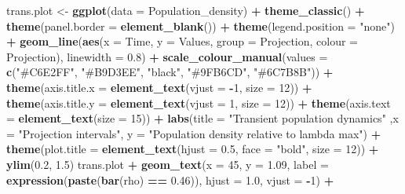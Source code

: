 \documentclass[
]{book}
\newenvironment{Shaded}{\begin{snugshade}}{\end{snugshade}}
\newcommand{\AttributeTok}[1]{\textcolor[rgb]{0.13,0.29,0.53}{#1}}
\newcommand{\DecValTok}[1]{\textcolor[rgb]{0.00,0.00,0.81}{#1}}
\newcommand{\FloatTok}[1]{\textcolor[rgb]{0.00,0.00,0.81}{#1}}
\newcommand{\FunctionTok}[1]{\textcolor[rgb]{0.13,0.29,0.53}{\textbf{#1}}}
\newcommand{\NormalTok}[1]{#1}
\newcommand{\OtherTok}[1]{\textcolor[rgb]{0.56,0.35,0.01}{#1}}
\newcommand{\SpecialCharTok}[1]{\textcolor[rgb]{0.81,0.36,0.00}{\textbf{#1}}}
\newcommand{\StringTok}[1]{\textcolor[rgb]{0.31,0.60,0.02}{#1}}
\theoremstyle{definition}
\theoremstyle{definition}
\theoremstyle{definition}
\theoremstyle{definition}
\theoremstyle{remark}
\begin{document}
\begin{Shaded}
\begin{Highlighting}[]
\NormalTok{trans.plot }\OtherTok{\textless{}{-}} \FunctionTok{ggplot}\NormalTok{(}\AttributeTok{data =}\NormalTok{ Population\_density) }\SpecialCharTok{+}
\FunctionTok{theme\_classic}\NormalTok{() }\SpecialCharTok{+}
\FunctionTok{theme}\NormalTok{(}\AttributeTok{panel.border =} \FunctionTok{element\_blank}\NormalTok{()) }\SpecialCharTok{+}
\FunctionTok{theme}\NormalTok{(}\AttributeTok{legend.position =} \StringTok{"none"}\NormalTok{) }\SpecialCharTok{+}
\FunctionTok{geom\_line}\NormalTok{(}\FunctionTok{aes}\NormalTok{(}\AttributeTok{x =}\NormalTok{ Time, }\AttributeTok{y =}\NormalTok{ Values, }\AttributeTok{group =}\NormalTok{ Projection, }\AttributeTok{colour =}\NormalTok{ Projection), }\AttributeTok{linewidth =} \FloatTok{0.8}\NormalTok{) }\SpecialCharTok{+}
\FunctionTok{scale\_colour\_manual}\NormalTok{(}\AttributeTok{values =} \FunctionTok{c}\NormalTok{(}\StringTok{"\#C6E2FF"}\NormalTok{, }\StringTok{"\#B9D3EE"}\NormalTok{, }\StringTok{"black"}\NormalTok{, }\StringTok{"\#9FB6CD"}\NormalTok{, }\StringTok{"\#6C7B8B"}\NormalTok{)) }\SpecialCharTok{+}
\FunctionTok{theme}\NormalTok{(}\AttributeTok{axis.title.x =} \FunctionTok{element\_text}\NormalTok{(}\AttributeTok{vjust =} \SpecialCharTok{{-}}\DecValTok{1}\NormalTok{, }\AttributeTok{size =} \DecValTok{12}\NormalTok{)) }\SpecialCharTok{+}
\FunctionTok{theme}\NormalTok{(}\AttributeTok{axis.title.y =} \FunctionTok{element\_text}\NormalTok{(}\AttributeTok{vjust =} \DecValTok{1}\NormalTok{, }\AttributeTok{size =} \DecValTok{12}\NormalTok{)) }\SpecialCharTok{+} 
\FunctionTok{theme}\NormalTok{(}\AttributeTok{axis.text =} \FunctionTok{element\_text}\NormalTok{(}\AttributeTok{size =} \DecValTok{15}\NormalTok{)) }\SpecialCharTok{+}
\FunctionTok{labs}\NormalTok{(}\AttributeTok{title =} \StringTok{"Transient population dynamics"}\NormalTok{ ,}\AttributeTok{x =} \StringTok{"Projection intervals"}\NormalTok{, }\AttributeTok{y =} \StringTok{"Population density relative to lambda max"}\NormalTok{) }\SpecialCharTok{+} 
\FunctionTok{theme}\NormalTok{(}\AttributeTok{plot.title =} \FunctionTok{element\_text}\NormalTok{(}\AttributeTok{hjust =} \FloatTok{0.5}\NormalTok{, }\AttributeTok{face =} \StringTok{"bold"}\NormalTok{, }\AttributeTok{size =} \DecValTok{12}\NormalTok{)) }\SpecialCharTok{+}
\FunctionTok{ylim}\NormalTok{(}\FloatTok{0.2}\NormalTok{, }\FloatTok{1.5}\NormalTok{)}
\NormalTok{trans.plot }\SpecialCharTok{+} 
\FunctionTok{geom\_text}\NormalTok{(}\AttributeTok{x =} \DecValTok{45}\NormalTok{, }\AttributeTok{y =} \FloatTok{1.09}\NormalTok{, }\AttributeTok{label =} \FunctionTok{expression}\NormalTok{(}\FunctionTok{paste}\NormalTok{(}\FunctionTok{bar}\NormalTok{(rho) }\SpecialCharTok{==} \FloatTok{0.46}\NormalTok{)), }\AttributeTok{hjust =} \FloatTok{1.0}\NormalTok{, }\AttributeTok{vjust =} \SpecialCharTok{{-}}\DecValTok{1}\NormalTok{) }\SpecialCharTok{+}

\end{Highlighting}
\end{Shaded}
\end{document}
